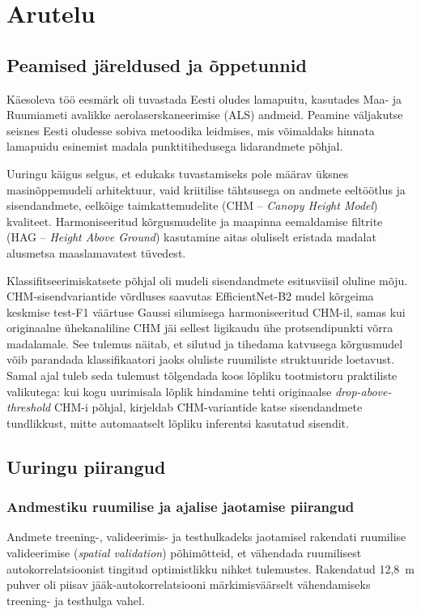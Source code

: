 \section{Arutelu}

\subsection{Peamised järeldused ja õppetunnid}
Käesoleva töö eesmärk oli tuvastada Eesti oludes lamapuitu, kasutades Maa- ja Ruumiameti avalikke aerolaserskaneerimise (ALS) andmeid. Peamine väljakutse seisnes Eesti oludesse sobiva metoodika leidmises, mis võimaldaks hinnata lamapuidu esinemist madala punktitihedusega lidarandmete põhjal.

Uuringu käigus selgus, et edukaks tuvastamiseks pole määrav üksnes masinõppemudeli arhitektuur, vaid kriitilise tähtsusega on andmete eeltöötlus ja sisendandmete, eelkõige taimkattemudelite (CHM – \textit{Canopy Height Model}) kvaliteet. Harmoniseeritud kõrgusmudelite ja maapinna eemaldamise filtrite (HAG – \textit{Height Above Ground}) kasutamine aitas oluliselt eristada madalat alusmetsa maaslamavatest tüvedest. 

Klassifitseerimiskatsete põhjal oli mudeli sisendandmete esitusviisil oluline mõju. CHM-sisendvariantide võrdluses saavutas EfficientNet-B2 mudel kõrgeima keskmise test-F1 väärtuse Gaussi silumisega harmoniseeritud CHM-il, samas kui originaalne ühekanaliline CHM jäi sellest ligikaudu ühe protsendipunkti võrra madalamale. See tulemus näitab, et silutud ja tihedama katvusega kõrgusmudel võib parandada klassifikaatori jaoks oluliste ruumiliste struktuuride loetavust. Samal ajal tuleb seda tulemust tõlgendada koos lõpliku tootmistoru praktiliste valikutega: kui kogu uurimisala lõplik hindamine tehti originaalse \textit{drop-above-threshold} CHM-i põhjal, kirjeldab CHM-variantide katse sisendandmete tundlikkust, mitte automaatselt lõpliku inferentsi kasutatud sisendit.

\subsection{Uuringu piirangud}
\label{subsec:metoodika-piirangud}

\subsubsection{Andmestiku ruumilise ja ajalise jaotamise piirangud}
Andmete treening-, valideerimis- ja testhulkadeks jaotamisel rakendati ruumilise valideerimise (\textit{spatial validation}) põhimõtteid, et vähendada ruumilisest autokorrelatsioonist tingitud optimistlikku nihket tulemustes. Rakendatud 12,8~m puhver oli piisav jääk-autokorrelatsiooni märkimisväärselt vähendamiseks treening- ja testhulga vahel.

